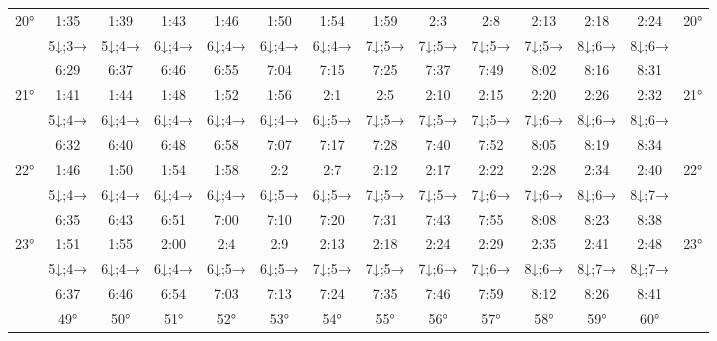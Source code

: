 \begin{scriptsize}
\begin{tabular}{c || c | c | c | c | c | c | c | c | c | c | c | c || c}
		\multirow{3}{*}{20°}&1:35&1:39&1:43&1:46&1:50&1:54&1:59&2:3&2:8&2:13&2:18&2:24&\multirow{3}{*}{20°}\\ \space&5↓;3→&5↓;4→&6↓;4→&6↓;4→&6↓;4→&6↓;4→&7↓;5→&7↓;5→&7↓;5→&7↓;5→&8↓;6→&8↓;6→&\space\\&6:29&6:37&6:46&6:55&7:04&7:15&7:25&7:37&7:49&8:02&8:16&8:31&\space\\\hline
		\multirow{3}{*}{21°}&1:41&1:44&1:48&1:52&1:56&2:1&2:5&2:10&2:15&2:20&2:26&2:32&\multirow{3}{*}{21°}\\ \space&5↓;4→&6↓;4→&6↓;4→&6↓;4→&6↓;4→&6↓;5→&7↓;5→&7↓;5→&7↓;5→&7↓;6→&8↓;6→&8↓;6→&\space\\&6:32&6:40&6:48&6:58&7:07&7:17&7:28&7:40&7:52&8:05&8:19&8:34&\space\\\hline
		\multirow{3}{*}{22°}&1:46&1:50&1:54&1:58&2:2&2:7&2:12&2:17&2:22&2:28&2:34&2:40&\multirow{3}{*}{22°}\\ \space&5↓;4→&6↓;4→&6↓;4→&6↓;4→&6↓;5→&6↓;5→&7↓;5→&7↓;5→&7↓;6→&7↓;6→&8↓;6→&8↓;7→&\space\\&6:35&6:43&6:51&7:00&7:10&7:20&7:31&7:43&7:55&8:08&8:23&8:38&\space\\\hline
		\multirow{3}{*}{23°}&1:51&1:55&2:00&2:4&2:9&2:13&2:18&2:24&2:29&2:35&2:41&2:48&\multirow{3}{*}{23°}\\ \space&5↓;4→&6↓;4→&6↓;4→&6↓;5→&6↓;5→&7↓;5→&7↓;5→&7↓;6→&7↓;6→&8↓;6→&8↓;7→&8↓;7→&\space\\&6:37&6:46&6:54&7:03&7:13&7:24&7:35&7:46&7:59&8:12&8:26&8:41&\space\\\hline
		\hline\space &49°&50°&51°&52°&53°&54°&55°&56°&57°&58°&59°&60°
\end{tabular}\end{scriptsize}

